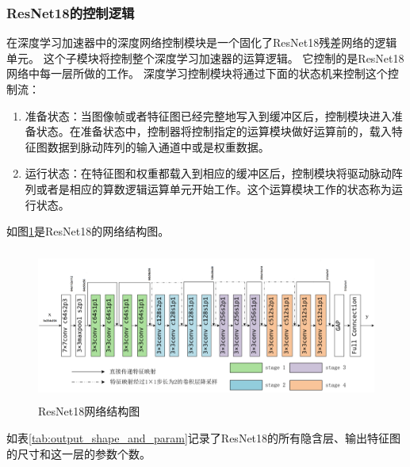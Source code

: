 \subsubsection{ResNet18的控制逻辑}
在深度学习加速器中的深度网络控制模块是一个固化了ResNet18残差网络的逻辑单元。
这个子模块将控制整个深度学习加速器的运算逻辑。
它控制的是ResNet18网络中每一层所做的工作。
深度学习控制模块将通过下面的状态机来控制这个控制流：
\begin{enumerate}
    \item 准备状态：当图像帧或者特征图已经完整地写入到缓冲区后，控制模块进入准备状态。在准备状态中，控制器将控制指定的运算模块做好运算前的，载入特征图数据到脉动阵列的输入通道中或是权重数据。
    \item 运行状态：在特征图和权重都载入到相应的缓冲区后，控制模块将驱动脉动阵列或者是相应的算数逻辑运算单元开始工作。这个运算模块工作的状态称为运行状态。
\end{enumerate}  
如图\ref{fig:resnet18_arch}是ResNet18的网络结构图。
\begin{figure}[htbp]
    \centering
    \includegraphics[width=12cm,height=5cm]{figures/resnet18_arch.png}
    \caption{ResNet18网络结构图}
    \label{fig:resnet18_arch}
\end{figure}

如表\ref{tab:output_shape_and_param}记录了ResNet18的所有隐含层、输出特征图的尺寸和这一层的参数个数。

